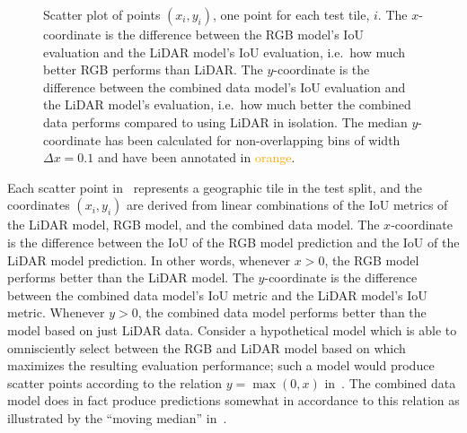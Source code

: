 \begin{figure}[H]
  \caption{%
    Scatter plot of points $(x_i, y_i)$, one point for each test tile, $i$.
    The $x$-coordinate is the difference between the RGB model's IoU evaluation and the LiDAR model's IoU evaluation, i.e.\ how much better RGB performs than LiDAR.
    The $y$-coordinate is the difference between the combined data model's IoU evaluation and the LiDAR model's evaluation, i.e.\ how much better the combined data performs compared to using LiDAR in isolation.
    The median $y$-coordinate has been calculated for non-overlapping bins of width $\Delta x = \num{0.1}$ and have been annotated in \textcolor{orange}{orange}.
  }%
  \label{fig:rgb-help}
\end{figure}

Each scatter point in~ represents a geographic tile in the test split, and the coordinates $(x_i, y_i)$ are derived from linear combinations of the IoU metrics of the LiDAR model, RGB model, and the combined data model.
The $x$-coordinate is the difference between the IoU of the RGB model prediction and the IoU of the LiDAR model prediction.
In other words, whenever $x > 0$, the RGB model performs better than the LiDAR model.
The $y$-coordinate is the difference between the combined data model's IoU metric and the LiDAR model's IoU metric.
Whenever $y > 0$, the combined data model performs better than the model based on just LiDAR data.
Consider a hypothetical model which is able to omnisciently select between the RGB and LiDAR model based on which maximizes the resulting evaluation performance; such a model would produce scatter points according to the relation $y = \max(0, x)$ in~.
The combined data model does in fact produce predictions somewhat in accordance to this relation as illustrated by the \enquote{moving median} in~.
